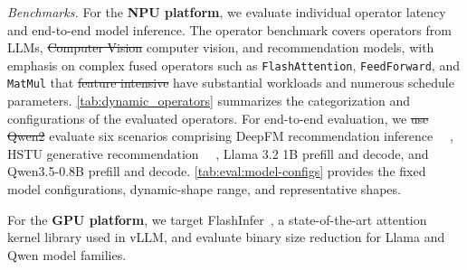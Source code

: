 \documentclass[manuscript,screen,review]{acmart}
\theoremstyle{indenteditalic}
\providecommand{\DIFaddtex}[1]{{\protect\color{blue}#1}} %
\providecommand{\DIFidentity}[1]{#1}
\providecommand{\DIFdeltex}[1]{{%
  \protect\color{red}%
  \normalfont\normalsize
  \let\textbf\DIFidentity
  \let\textit\DIFidentity
  \let\texttt\DIFidentity
  \let\textsc\DIFidentity
  \let\textsf\DIFidentity
  \let\emph\DIFidentity
  \let\uline\DIFidentity
  \sout{#1}%
}} %
\providecommand{\DIFaddbegin}{} %
\providecommand{\DIFaddend}{} %
\providecommand{\DIFdelbegin}{} %
\providecommand{\DIFdelend}{} %
\providecommand{\DIFadd}[1]{\texorpdfstring{\DIFaddtex{#1}}{#1}} %
\providecommand{\DIFdel}[1]{\texorpdfstring{\DIFdeltex{#1}}{}} %
\begin{document}
\DIFaddend \textit{Benchmarks\DIFadd{.}}
\label{sec:eval:bench}
For the \textbf{NPU platform}, we evaluate individual operator latency and end-to-end model inference.
The operator benchmark covers operators from LLMs, \DIFdel{Computer Vision}\DIFadd{computer vision}, and recommendation models, with emphasis on complex fused operators such as \texttt{FlashAttention}, \texttt{FeedForward}, and \texttt{MatMul} that \DIFdel{feature intensive}\DIFadd{have substantial} workloads and numerous schedule parameters.
\autoref{tab:dynamic_operators} summarizes the categorization and configurations of the evaluated operators.
For end-to-end evaluation, we \DIFdelbegin \DIFdel{use Qwen2}\DIFdelend\space \DIFaddbegin \DIFadd{evaluate six scenarios comprising DeepFM recommendation inference~\mbox{%
\cite{ijcai2017p239}}\hspace{0pt}%
, HSTU generative recommendation~\mbox{%
\cite{pmlr-v235-zhai24a}}\hspace{0pt}%
, Llama 3.2 1B prefill and decode, and Qwen3.5-0.8B prefill and decode.
}\autoref{tab:eval:model-configs} \DIFadd{provides the fixed model configurations, dynamic-shape range, and representative shapes}\DIFaddend .

For the \textbf{GPU platform}, we target FlashInfer~\cite{ye2025flashinfer}, a state-of-the-art attention kernel library used in vLLM, and evaluate binary size reduction for Llama and Qwen model families.
\end{document}
